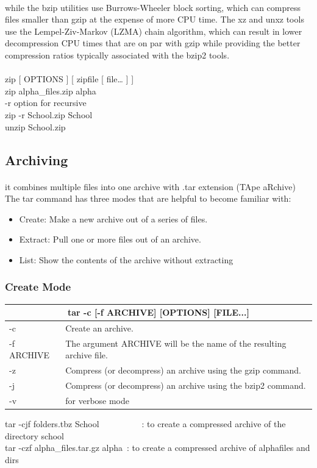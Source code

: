 \documentclass[10pt]{article}
\begin{document}
\paragraph{}while the bzip utilities use Burrows-Wheeler block sorting, which can compress files smaller than gzip at the expense of more CPU time.
The xz and unxz tools use the Lempel-Ziv-Markov (LZMA) chain algorithm, which can result in lower decompression CPU times that are
on par with gzip while providing the better compression ratios typically associated with the bzip2 tools.
\\\\
zip [ OPTIONS ] [ zipfile [ file… ] ]\\
zip alpha\_files.zip alpha\textasteriskcentered  \\
-r option for recursive\\
zip -r School.zip School\\
unzip School.zip\\
\subsection{Archiving}
\paragraph{}it combines multiple files into one archive with .tar extension (TApe aRchive)
The tar command has three modes that are helpful to become familiar with:
\begin{itemize}
	\item	Create: Make a new archive out of a series of files.
	\item Extract: Pull one or more files out of an archive.
	\item List: Show the contents of the archive without extracting
\end{itemize}
\subsubsection{Create Mode}
\begin{center}
	\begin{tabular}{|l|l|}
		\hline \multicolumn{2}{|c|}{tar -c [-f ARCHIVE] [OPTIONS] [FILE...]} \\
		\hline -c		&	Create an archive.\\
		\hline -f ARCHIVE &	The argument ARCHIVE will be the name of the resulting archive file.\\
		\hline -z	&		Compress (or decompress) an archive using the gzip command.\\
		\hline -j &			Compress (or decompress) an archive using the bzip2 command.\\
		\hline -v & for  verbose mode\\
		\hline
	\end{tabular}
\end{center}
tar -cjf folders.tbz School\ \ \ \ \ \ \ \ \ \ : to create a compressed archive of the directory school\\
tar -czf alpha\_files.tar.gz alpha\textasteriskcentered\ : to create a compressed archive of alpha\textasteriskcentered   files and dirs
\end{document}
